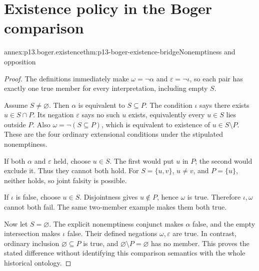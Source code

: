 \section{Existence policy in the Boger comparison}
\label{sec:p13-boger-annex}

\begin{annexitem}{annex:p13.boger.existence}{thm:p13-boger-existence-bridge}{Nonemptiness and opposition}
\begin{proof}
The definitions immediately make \(\omega=\neg\alpha\) and
\(\varepsilon=\neg\iota\), so each pair has exactly one true member
for every interpretation, including empty \(S\).

Assume \(S\ne\varnothing\). Then \(\alpha\) is equivalent to
\(S\subseteq P\). The condition \(\iota\) says there exists
\(u\in S\cap P\). Its negation \(\varepsilon\) says no such \(u\)
exists, equivalently every \(u\in S\) lies outside \(P\).
Also \(\omega=\neg(S\subseteq P)\), which is equivalent to existence
of \(u\in S\setminus P\). These are the four ordinary extensional
conditions under the stipulated nonemptiness.

If both \(\alpha\) and \(\varepsilon\) held, choose \(u\in S\).
The first would put \(u\) in \(P\); the second would exclude it.
Thus they cannot both hold. For \(S=\{u,v\}\), \(u\ne v\), and
\(P=\{u\}\), neither holds, so joint falsity is possible.

If \(\iota\) is false, choose \(u\in S\). Disjointness gives
\(u\notin P\), hence \(\omega\) is true. Therefore \(\iota,\omega\)
cannot both fail. The same two-member example makes them both true.

Now let \(S=\varnothing\). The explicit nonemptiness conjunct makes
\(\alpha\) false, and the empty intersection makes \(\iota\) false.
Their defined negations \(\omega,\varepsilon\) are true. In contrast,
ordinary inclusion \(\varnothing\subseteq P\) is true, and
\(\varnothing\setminus P=\varnothing\) has no member. This proves
the stated difference without identifying this comparison semantics
with the whole historical ontology.
\end{proof}
\end{annexitem}
